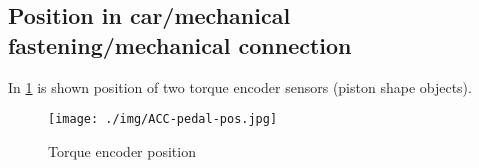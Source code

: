 \subsection{Position in car/mechanical fastening/mechanical connection}
In \ref{fig:torque_encoder_position} is shown position of two torque encoder sensors (piston shape objects).

\begin{figure}[H]
\begin{center}
	\texttt{[image: ./img/ACC-pedal-pos.jpg]}
	\caption{Torque encoder position}
	\label{fig:torque_encoder_position}
\end{center}
\end{figure}





